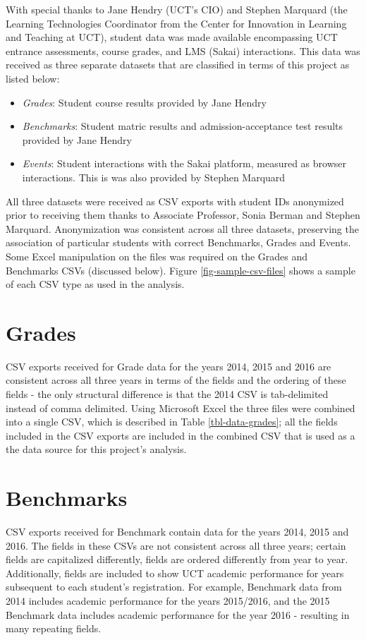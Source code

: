 With special thanks to Jane Hendry (UCT's CIO) and Stephen Marquard (the Learning Technologies Coordinator from the Center for Innovation in Learning and Teaching at UCT), student data was made available encompassing UCT entrance assessments, course grades, and LMS (Sakai) interactions. This data was received as three separate datasets that are classified in terms of this project as listed below:

\begin{itemize}
    \item \textit{Grades}: Student course results provided by Jane Hendry
    \item \textit{Benchmarks}: Student matric results and admission-acceptance test results provided by Jane Hendry
    \item \textit{Events}: Student interactions with the Sakai platform, measured as browser interactions. This is was also provided by Stephen Marquard
\end{itemize}

All three datasets were received as CSV exports with student IDs anonymized prior to receiving them thanks to Associate Professor, Sonia Berman and Stephen Marquard. Anonymization was consistent across all three datasets, preserving the association of particular students with correct Benchmarks, Grades and Events. Some Excel manipulation on the files was required on the Grades and Benchmarks CSVs (discussed below). Figure \ref{fig-sample-csv-files} shows a sample of each CSV type as used in the analysis.

\section{Grades}
CSV exports received for Grade data for the years 2014, 2015 and 2016 are consistent across all three years in terms of the fields and the ordering of these fields - the only structural difference is that the 2014 CSV is tab-delimited instead of comma delimited. Using Microsoft Excel the three files were combined into a single CSV, which is described in Table \ref{tbl-data-grades}; all the fields included in the CSV exports are included in the combined CSV that is used as a the data source for this project's analysis.

\section{Benchmarks}
CSV exports received for Benchmark contain data for the years 2014, 2015 and 2016. The fields in these CSVs are not consistent across all three years; certain fields are capitalized differently, fields are ordered differently from year to year. Additionally, fields are included to show UCT academic performance for years subsequent to each student's registration. For example, Benchmark data from 2014 includes academic performance for the years 2015/2016, and the 2015 Benchmark data includes academic performance for the year 2016 - resulting in many repeating fields.

